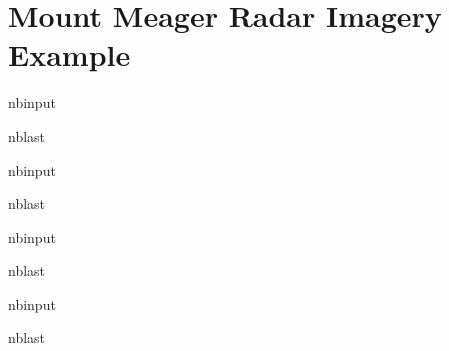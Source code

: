 \documentclass[letterpaper,10pt,english]{sphinxmanual}
\begin{document}
\section{Mount Meager Radar Imagery Example}
\label{\detokenize{notebooks/Meager_radar:Mount-Meager-Radar-Imagery-Example}}\label{\detokenize{notebooks/Meager_radar::doc}}
\begin{sphinxuseclass}{nbinput}
\begin{sphinxuseclass}{nblast}
{
\begin{sphinxVerbatim}[commandchars=\\\{\}]
\llap{\color{nbsphinxin}[ ]:\,\hspace{\fboxrule}\hspace{\fboxsep}}
\end{sphinxVerbatim}
}

\end{sphinxuseclass}
\end{sphinxuseclass}
\begin{sphinxuseclass}{nbinput}
\begin{sphinxuseclass}{nblast}
{
\begin{sphinxVerbatim}[commandchars=\\\{\}]
\llap{\color{nbsphinxin}[ ]:\,\hspace{\fboxrule}\hspace{\fboxsep}}
\end{sphinxVerbatim}
}

\end{sphinxuseclass}
\end{sphinxuseclass}
\begin{sphinxuseclass}{nbinput}
\begin{sphinxuseclass}{nblast}
{
\begin{sphinxVerbatim}[commandchars=\\\{\}]
\llap{\color{nbsphinxin}[ ]:\,\hspace{\fboxrule}\hspace{\fboxsep}}
\end{sphinxVerbatim}
}

\end{sphinxuseclass}
\end{sphinxuseclass}
\begin{sphinxuseclass}{nbinput}
\begin{sphinxuseclass}{nblast}
{
\begin{sphinxVerbatim}[commandchars=\\\{\}]
\llap{\color{nbsphinxin}[ ]:\,\hspace{\fboxrule}\hspace{\fboxsep}}
\end{sphinxVerbatim}
}

\end{sphinxuseclass}
\end{sphinxuseclass}
\end{document}
